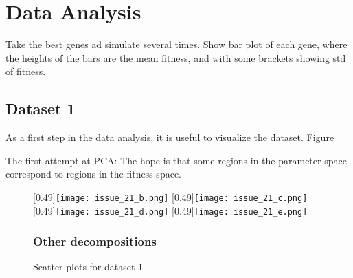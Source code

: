
\chapter{Data Analysis} %

\label{chapter:model} %
	

Take the best genes ad simulate several times. Show bar plot of each gene, where the heights of the bars are the mean fitness, and with some brackets showing std of fitness.

\section{Dataset 1}

As a first step in the data analysis, it is useful to visualize the dataset. Figure 

The first attempt at PCA: The hope is that some regions in the parameter space correspond to regions in the fitness space. 
\begin{figure}
\centering
\subcaptionbox{\label{subfig:}}
[0.49\linewidth]{\texttt{[image: issue\_21\_b.png]}}
\subcaptionbox{\label{subfig:}}
[0.49\linewidth]{\texttt{[image: issue\_21\_c.png]}}
\subcaptionbox{\label{subfig:}}
[0.49\linewidth]{\texttt{[image: issue\_21\_d.png]}}
\subcaptionbox{\label{subfig:}}
[0.49\linewidth]{\texttt{[image: issue\_21\_e.png]}}

\caption{Scatter plots for dataset 1}\label{fig:scatter_plot_dataset1}

\subsection{Other decompositions} %
\label{sub:other_decompositions}




\end{figure}